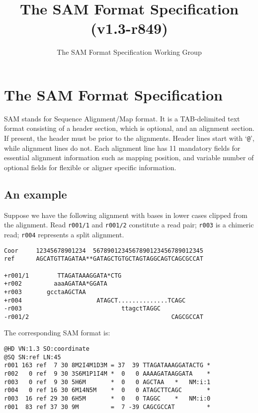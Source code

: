 \documentclass[10pt]{article}
\title{The SAM Format Specification (v1.3-r849)}
\author{The SAM Format Specification Working Group}
\begin{document}
\maketitle


\section{The SAM Format Specification}
SAM stands for Sequence Alignment/Map format. It is a TAB-delimited text
format consisting of a header section, which is optional, and an
alignment section. If present, the header must be prior to the
alignments. Header lines start with `{\tt @}', while alignment lines do
not. Each alignment line has 11 mandatory fields for essential alignment
information such as mapping position, and variable number of optional
fields for flexible or aligner specific information.

\subsection{An example}
Suppose we have the following alignment with bases in lower cases
clipped from the alignment. Read {\tt r001/1} and {\tt r001/2}
constitute a read pair; {\tt r003} is a chimeric read; {\tt r004}
represents a split alignment.

\begin{framed}\small
\begin{verbatim}
Coor     12345678901234  5678901234567890123456789012345
ref      AGCATGTTAGATAA**GATAGCTGTGCTAGTAGGCAGTCAGCGCCAT

+r001/1        TTAGATAAAGGATA*CTG
+r002         aaaAGATAA*GGATA
+r003       gcctaAGCTAA
+r004                     ATAGCT..............TCAGC
-r003                            ttagctTAGGC
-r001/2                                        CAGCGCCAT
\end{verbatim}
\end{framed}
The corresponding SAM format is:
\begin{framed}\small
\begin{verbatim}
@HD VN:1.3 SO:coordinate
@SQ SN:ref LN:45
r001 163 ref  7 30 8M2I4M1D3M = 37  39 TTAGATAAAGGATACTG *
r002   0 ref  9 30 3S6M1P1I4M *  0   0 AAAAGATAAGGATA    *
r003   0 ref  9 30 5H6M       *  0   0 AGCTAA   *   NM:i:1
r004   0 ref 16 30 6M14N5M    *  0   0 ATAGCTTCAGC       *
r003  16 ref 29 30 6H5M       *  0   0 TAGGC    *   NM:i:0
r001  83 ref 37 30 9M         =  7 -39 CAGCGCCAT         *
\end{verbatim}
\end{framed}
\end{document}
